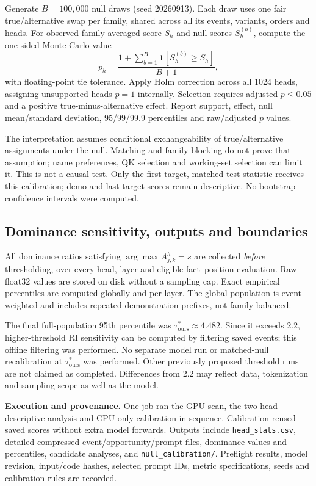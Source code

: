 \documentclass[11pt,a4paper]{article}
\newcommand{\file}[1]{\nolinkurl{#1}}
\begin{document}
Generate $B=100{,}000$ null draws (seed 20260913). Each draw uses one fair true/alternative swap per family, shared across all its events, variants, orders and heads. For observed family-averaged score $S_h$ and null scores $S_h^{(b)}$, compute the one-sided Monte Carlo value
\begin{equation}
p_h=\frac{1+\sum_{b=1}^{B}\mathbf{1}[S_h^{(b)}\ge S_h]}{B+1},
\end{equation}
with floating-point tie tolerance. Apply Holm correction across all 1024 heads, assigning unsupported heads $p=1$ internally. Selection requires adjusted $p\le0.05$ and a positive true-minus-alternative effect. Report support, effect, null mean/standard deviation, 95/99/99.9 percentiles and raw/adjusted $p$ values.

The interpretation assumes conditional exchangeability of true/alternative assignments under the null. Matching and family blocking do not prove that assumption; name preferences, QK selection and working-set selection can limit it. This is not a causal test. Only the first-target, matched-test statistic receives this calibration; demo and last-target scores remain descriptive. No bootstrap confidence intervals were computed.

\subsection{Dominance sensitivity, outputs and boundaries}
All dominance ratios satisfying $\arg\max A^h_{j,k}=s$ are collected \emph{before} thresholding, over every head, layer and eligible fact--position evaluation. Raw float32 values are stored on disk without a sampling cap. Exact empirical percentiles are computed globally and per layer. The global population is event-weighted and includes repeated demonstration prefixes, not family-balanced.

The final full-population 95th percentile was $\tau^*_{\mathrm{ours}}\approx4.482$. Since it exceeds 2.2, higher-threshold RI sensitivity can be computed by filtering saved events; this offline filtering was performed. No separate model run or matched-null recalibration at $\tau^*_{\mathrm{ours}}$ was performed. Other previously proposed threshold runs are not claimed as completed. Differences from 2.2 may reflect data, tokenization and sampling scope as well as the model.

\textbf{Execution and provenance.} One job ran the GPU scan, the two-head descriptive analysis and CPU-only calibration in sequence. Calibration reused saved scores without extra model forwards. Outputs include \file{head_stats.csv}, detailed compressed event/opportunity/prompt files, dominance values and percentiles, candidate analyses, and \file{null_calibration/}. Preflight results, model revision, input/code hashes, selected prompt IDs, metric specifications, seeds and calibration rules are recorded.
\end{document}
